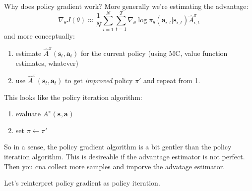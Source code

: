 \documentclass{report}
\begin{document}
Why does policy gradient work?
More generally we're estimating the advantage:
\begin{equation}
		\nabla_{ \theta } J (\theta) \approx \frac{1}{N} \sum_{i=1}^{N} \sum_{t=1}^{T} \nabla_{ \theta }\log \pi_{ \theta } (\bm{a}_{i,t}| \bm{s}_{i,t} ) \hat{A}_{ i,t }^{ \pi }
\end{equation}
and more conceptually:
\begin{enumerate}
		\item estimate $ \hat{A}^{ \pi } (\bm{s}_{t}, \bm{a}_{t} )  $ for the current policy (using MC, value function estimates, whatever)
		\item use $ \hat{A}^{ \pi } (\bm{s}_{t}, \bm{a}_{t} )  $ to get \textit{improved} policy $ \pi'  $ and repeat from 1.
\end{enumerate}
This looks like the policy iteration algorithm:
\begin{enumerate}
		\item evaluate $ A^{ \pi } (\bm{s}_{}, \bm{a}_{} )  $
		\item set $ \pi \leftarrow \pi'  $
\end{enumerate}
So in a sense, the policy gradient algorithm is a bit gentler than the policy iteration algorithm.
This is desireable if the advantage estimator is not perfect. Then you cna collect more samples
and imporve the advatage estimator.

Let's reinterpret policy gradient as policy iteration.
\end{document}
